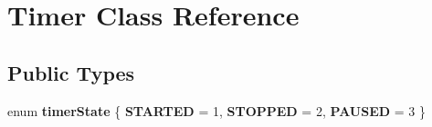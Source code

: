 \hypertarget{class_timer}{\section{Timer Class Reference}
\label{class_timer}
}
\subsection*{Public Types}
\begin{DoxyCompactItemize}
\item 
\hypertarget{class_timer_acf57aebeb0fc23487706a25e323ffb53}{enum {\bfseries timer\+State} \{ {\bfseries S\+T\+A\+R\+T\+E\+D} = 1, 
{\bfseries S\+T\+O\+P\+P\+E\+D} = 2, 
{\bfseries P\+A\+U\+S\+E\+D} = 3
 \}}\label{class_timer_acf57aebeb0fc23487706a25e323ffb53}

\end{DoxyCompactItemize}
